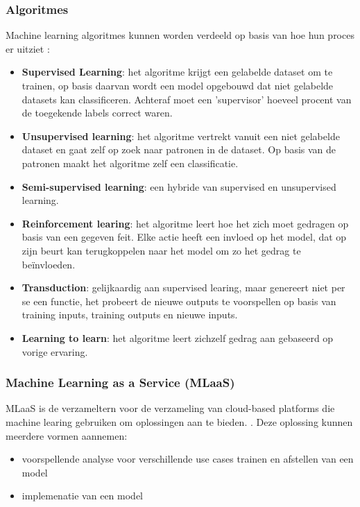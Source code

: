 \subsubsection{Algoritmes}
Machine learning algoritmes kunnen worden verdeeld op basis van hoe hun proces er uitziet :
\begin{itemize}
	\item \textbf{Supervised Learning}: het algoritme krijgt een gelabelde dataset om te trainen, op basis daarvan wordt een model opgebouwd dat niet gelabelde datasets kan classificeren. Achteraf moet een 'supervisor' hoeveel procent van de toegekende labels correct waren. 
	\item \textbf{Unsupervised learning}: het algoritme vertrekt vanuit een niet gelabelde dataset en gaat zelf op zoek naar patronen in de dataset. Op basis van de patronen maakt het algoritme zelf een classificatie.
	\item \textbf{Semi-supervised learning}: een hybride van supervised en unsupervised learning.
	\item \textbf{Reinforcement learing}: het algoritme leert hoe het zich moet gedragen op basis van een gegeven feit. Elke actie heeft een invloed op het model, dat op zijn beurt kan terugkoppelen naar het model om zo het gedrag te beïnvloeden.
	\item \textbf{Transduction}: gelijkaardig aan supervised learing, maar genereert niet per se een functie, het probeert de nieuwe outputs te voorspellen op basis van training inputs, training outputs en nieuwe inputs.
	\item \textbf{Learning to learn}: het algoritme leert zichzelf gedrag aan gebaseerd op vorige ervaring.
\end{itemize}
\autocite{Zhang2010}


\subsubsection{Machine Learning as a Service (MLaaS)}
MLaaS is de verzameltern voor de verzameling van cloud-based platforms die machine learing gebruiken om oplossingen aan te bieden. \autocite{Onose2022}. Deze oplossing kunnen meerdere vormen aannemen: 
\begin{itemize}
	\item voorspellende analyse voor verschillende use cases
	\iten trainen en afstellen van een model
	\item implemenatie van een model
\end{itemize}

